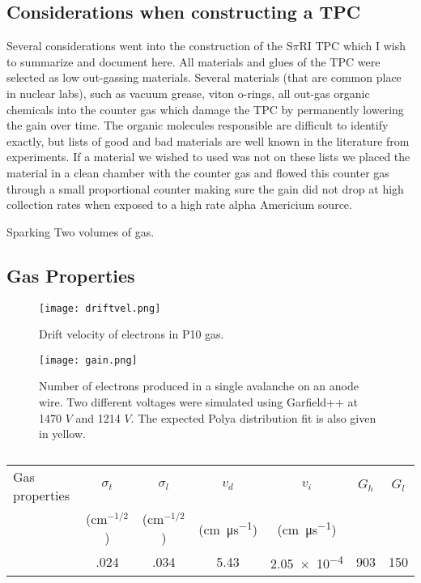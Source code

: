 \subsection{Considerations when constructing a TPC}
Several considerations went into the construction of the S$\pi$RI TPC which I wish to summarize and document here. All materials and glues of the TPC were selected as low out-gassing materials. Several materials (that are common place in nuclear labs), such as vacuum grease, viton o-rings, all out-gas organic chemicals into the counter gas which damage the TPC by permanently lowering the gain over time. The organic molecules responsible are difficult to identify exactly, but lists of good and bad materials are well known in the literature from experiments. If a material we wished to used was not on these lists we placed the material in a clean chamber with the counter gas and flowed this counter gas through a small proportional counter making sure the gain did not drop at high collection rates when exposed to a high rate alpha Americium source. 

Sparking
Two volumes of gas. 


\subsection{Gas Properties}

\begin{figure}[H]
\texttt{[image: driftvel.png]}
\caption{Drift velocity of electrons in P10 gas.}
\label{fig:driftvel}
\end{figure}

\begin{figure}
\texttt{[image: gain.png]}
\caption{Number of electrons produced in a single avalanche on an anode wire. Two different voltages were simulated using Garfield++ at 1470 $V$ and 1214 $V$. The expected Polya distribution fit is also given in yellow.}
\label{fig:anodegain}
\end{figure}

\begin{table}[!htp] %
\centering %
\begin{tabular}{
  @{}
  l
  S[table-format=1.2]
  S[table-format=1.2]
  S[table-format=1.2]
  S[table-format=1.2]
  S[table-format=5.2]
  S[table-format=5.2]
  @{}
}
\toprule
Gas properties &
 {$\sigma_{t}$} &
 {$\sigma_{l}$} &
 {$v_{d}$} &
 {$v_{i}$}  &
 {$G_{h}$} &
 {$G_{l}$} \\
&
  {($\si{\centi\meter}^{-1/2}$)} &
  {($\si{\centi\meter}^{-1/2}$)} &
  {(\si{\centi\meter\per\micro\second})} &
 {(\si{\centi\meter\per\micro\second})} \\

\midrule
\phantom{abc}   &.024   &.034  &5.43  &  \num{2.05e-4} &  903   &150     \\
\bottomrule
\end{tabular}

\caption{}
\label{tb:gasprop}
\end{table}


